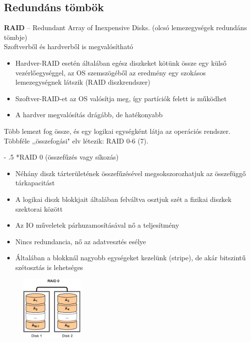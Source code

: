 \documentclass[tikz,12pt,margin=0px]{article}
\makeatletter
\renewcommand\paragraph{%
	\@startsection{paragraph}{4}{0mm}%
	{-\baselineskip}%
	{.5\baselineskip}%
	{\normalfont\normalsize\bfseries}}
\makeatother
\begin{document}
	\subsection*{Redundáns tömbök}
	
    \textbf{RAID} -- Redundant Array of Inexpensive Disks. (olcsó lemezegységek redundáns tömbje)\\

    \noindent Szoftverből és hardverből is megvalósítható
    \begin{itemize}[topsep=8pt,itemsep=4pt,partopsep=4pt, parsep=4pt]
        \item Hardver-RAID esetén általában egész diszkeket kötünk össze egy külső vezérlőegységgel, az OS szemszögéből az eredmény egy szokásos lemezegységnek látszik (RAID diszkrendszer)
        \item Szoftver-RAID-et az OS valósítja meg, így partíciók felett is működhet
        \item A hardver megvalósítás drágább, de hatékonyabb
    \end{itemize}

    \noindent Több lemezt fog össze, és egy logikai egységként látja az operációs rendszer. Többféle ,,összefogási" elv létezik: RAID 0-6 (7).

	\paragraph*{RAID 0 (összefűzés vagy síkozás)}

    \begin{itemize}[topsep=8pt,itemsep=4pt,partopsep=4pt, parsep=4pt]
        \item Néhány diszk tárterületének összefűzésével megsokszorozhatjuk az összefüggő tárkapacitást
        \item A logikai diszk blokkjait általában felváltva osztjuk szét a fizikai diszkek szektorai között
        \item Az IO műveletek párhuzamosításával nő a teljesítmény
        \item Nincs redundancia, nő az adatvesztés esélye
        \item Általában a blokknál nagyobb egységeket kezelünk (stripe), de akár bitszintű szétosztás is lehetséges
    \end{itemize}

    \begin{figure}[H]
        \centering
        \includegraphics[width=0.275\textwidth]{img/raid0.png}
        \label{ref:raid0}
    \end{figure}
\end{document}
